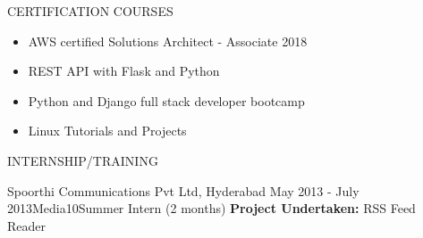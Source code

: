 \documentclass{resume} %
\begin{document}
\begin{rSection}{CERTIFICATION COURSES}
  \begin{itemize}
  \item AWS certified Solutions Architect - Associate 2018 
  \item REST API with Flask and Python
  \item Python and Django full stack developer bootcamp
  \item Linux Tutorials and Projects
    
  \end{itemize}

\end{rSection}


\begin{rSection}{INTERNSHIP/TRAINING}
  \begin{rSubsection}
  {Spoorthi Communications Pvt Ltd, Hyderabad} {May 2013 - July
    2013}{Media10}{Summer Intern (2 months)}
  \textbf{Project Undertaken:} RSS Feed Reader
  \end{rSubsection} 

\end{rSection} 



\end{document}
